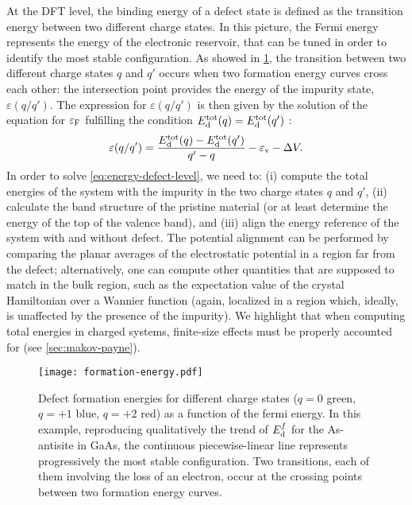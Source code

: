 At the DFT level, the binding energy of a defect state is defined as the transition energy between two different charge states. In this picture, the Fermi energy represents the energy of the electronic reservoir, that can be tuned in order to identify the most stable configuration. As showed in \cref{fig:formation-energy}, the transition between two different charge states $q$ and $q'$ occurs when two formation energy curves cross each other: the intersection point provides the energy of the impurity state, $\varepsilon(q/q')$. The expression for $\varepsilon(q/q')$ is then given by the solution of the equation for $\varepsilon_{\rm F}$ fulfilling the condition $E^{\rm tot}_{\rm d}(q) = E^{\rm tot}_{\rm d}(q')$ \cite{chen_first-principles_2015}:
%
\begin{equation}
    \varepsilon(q/q') = \frac{E^{\rm tot}_{\rm d}(q) - E^{\rm tot}_{\rm d}(q')}{q' - q} -\varepsilon_{\rm v} - \Delta V .
    \label{eq:energy-defect-level}
\end{equation}
%
In order to solve \cref{eq:energy-defect-level}, we need to: (i) compute the total energies of the system with the impurity in the two charge states $q$ and $q'$, (ii) calculate the band structure of the pristine material (or at least determine the energy of the top of the valence band), and (iii) align the energy reference of the system with and without defect. The potential alignment can be performed by comparing the planar averages of the electrostatic potential in a region far from the defect; alternatively, one can compute other quantities that are supposed to match in the bulk region, such as the expectation value of the crystal Hamiltonian over a Wannier function (again, localized in a region which, ideally, is unaffected by the presence of the impurity). We highlight that when computing total energies in charged systems, finite-size effects must be properly accounted for (see \cref{sec:makov-payne}).

\begin{figure}
    \centering
    \texttt{[image: formation-energy.pdf]}
    \caption[Charge-transition states obtained from the defect formation energy]{Defect formation energies for different charge states ($q=0$ green, $q=+1$ blue, $q=+2$ red) as a function of the fermi energy. In this example, reproducing qualitatively the trend of $E^f_{\rm d}$ for the As-antisite in GaAs, the continuous piecewise-linear line represents progressively the most stable configuration. Two transitions, each of them involving the loss of an electron, occur at the crossing points between two formation energy curves.}
    \label{fig:formation-energy}
\end{figure}

